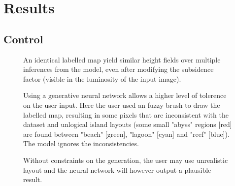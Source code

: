 
\section{Results}
\label{sec:coral-island_results}

\subsection{Control}

\begin{figure}[H]
    \caption{An identical labelled map yield similar height fields over multiple inferences from the model, even after modifying the subsidence factor (visible in the luminosity of the input image).}
    \label{fig:coral-island_results1}
\end{figure}
\begin{figure}[H]
    \caption{Using a generative neural network allows a higher level of tolerence on the user input. Here the user used an fuzzy brush to draw the labelled map, resulting in some pixels that are inconsistent with the dataset and unlogical island layouts (some small "abyss" regions [red] are found between "beach" [green], "lagoon" [cyan] and "reef" [blue]). The model ignores the inconsistencies. }
    \label{fig:coral-island_results2}
\end{figure}
\begin{figure}[H]
    \caption{Without constraints on the generation, the user may use unrealistic layout and the neural network will however output a plausible result.}
    \label{fig:coral-island_results_dino}
\end{figure}



